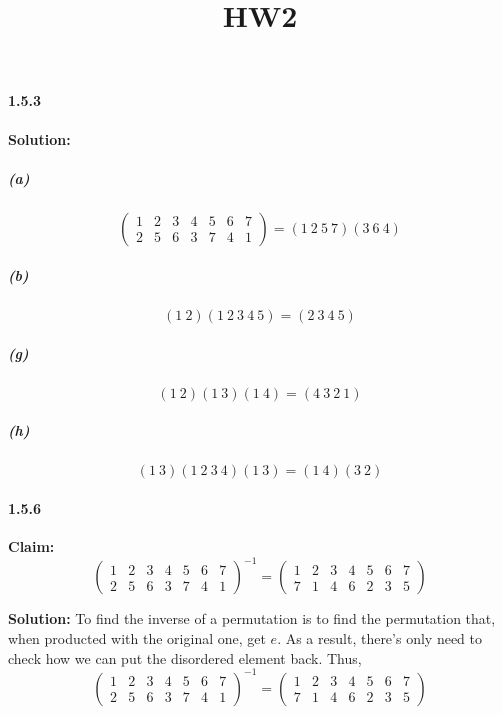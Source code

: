 \documentclass[11pt]{article}
\title{HW2}
\begin{document}
\paragraph{1.5.3}\textbf{Solution:}
\subparagraph{(a)} \[\left( \begin{array}{ccccccc} 1 & 2 & 3 & 4 & 5 & 6 & 7\\ 2 & 5 & 6 & 3 & 7 & 4 & 1 \end{array} \right) = (1\ 2\ 5\ 7)(3\ 6\ 4)\]
\subparagraph{(b)} \[(1\ 2)(1\ 2\ 3\ 4\ 5) = (2\ 3\ 4\ 5)\]
\subparagraph{(g)} \[(1\ 2)(1\ 3)(1\ 4) = (4\ 3\ 2\ 1)\]
\subparagraph{(h)} \[(1\ 3)(1\ 2\ 3\ 4)(1\ 3) = (1\ 4)(3\ 2)\]

\paragraph{1.5.6}\textbf{Claim: } \[\left( \begin{array}{ccccccc} 1 & 2 & 3 & 4 & 5 & 6 & 7\\ 2 & 5 & 6 & 3 & 7 & 4 & 1 \end{array} \right)^{-1} = \left( \begin{array}{ccccccc} 1 & 2 & 3 & 4 & 5 & 6 & 7\\ 7 & 1 & 4 & 6 & 2 & 3 & 5 \end{array} \right)\]

\textbf{Solution:} To find the inverse of a permutation is to find the permutation that, when producted with the original one, get $e$. As a result, there's only need to check how we can put the disordered element back. Thus, 
    \[\left( \begin{array}{ccccccc} 1 & 2 & 3 & 4 & 5 & 6 & 7\\ 2 & 5 & 6 & 3 & 7 & 4 & 1 \end{array} \right)^{-1} = \left( \begin{array}{ccccccc} 1 & 2 & 3 & 4 & 5 & 6 & 7\\ 7 & 1 & 4 & 6 & 2 & 3 & 5 \end{array} \right)\]
\end{document}
